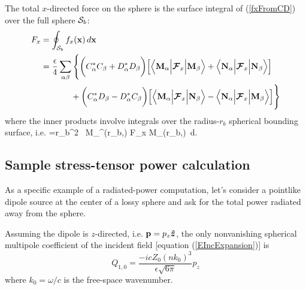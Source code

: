 \documentclass[letterpaper]{article}
\begin{document}
The total $x$-directed force on the sphere is the surface integral of
(\ref{fxFromCD}) over the full sphere $\mathcal{S}_b$:
\begin{align}
F_x &= \oint_{\mathcal{S}_b} f_x(\mathbf{x}) \, d\mathbf{x}
\nonumber\\
&=
\frac{\epsilon}{4}\sum_{\alpha \beta}
\Bigg\{ \bigg(C_\alpha^* C_\beta + D_\alpha^* D_\beta \bigg)
         \Big[  \Big\langle \mathbf{M}_\alpha \Big| \boldsymbol{\mathcal{F}}_x \Big| \mathbf{M}_\beta \Big\rangle
              +\Big\langle \mathbf{N}_\alpha \Big| \boldsymbol{\mathcal{F}}_x \Big| \mathbf{N}_\beta \Big\rangle
        \Big]
\nonumber\\
&\hspace{0.5in}
       +
        \bigg(C_\alpha^* D_\beta - D_\alpha^* C_\beta \bigg)
        \Big[  \Big\langle \mathbf{M}_\alpha \Big| \boldsymbol{\mathcal{F}}_x \Big| \mathbf{N}_\beta \Big\rangle
              -\Big\langle \mathbf{N}_\alpha \Big| \boldsymbol{\mathcal{F}}_x \Big| \mathbf{M}_\beta \Big\rangle
        \Big]
\Bigg\}
\label{TotalForce}
\end{align}
where the inner products involve integrals over the radius-$r_b$ 
spherical bounding surface, i.e.
{
=r_b^2 \int\, \vb M_\alpha^\dagger (r_b,\Omega) \bmc F_x \vb M_\beta(r_b,\Omega)
           \,d\Omega.
}

\subsection{Sample stress-tensor power calculation}

As a specific example of a radiated-power computation,
let's consider a pointlike dipole source at the center of 
a lossy sphere and ask for the total power radiated away
from the sphere.

Assuming the dipole is $z$-directed, i.e.
$\mathbf{p}=p_z \boldsymbol{\hat{z}}$, the only nonvanishing 
spherical multipole coefficient of the incident 
field [equation (\ref{EIncExpansion})] is
$$ Q_{1,0} = \frac{-i c Z_0 (nk_0)^3 }{\epsilon \sqrt{6\pi}} p_z $$
where $k_0=\omega/c$ is the free-space wavenumber.
\end{document}
